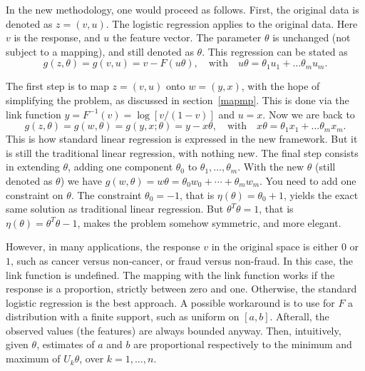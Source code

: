 \documentclass[oneside,10pt]{book}
\begin{document}
In the new methodology, one would proceed as follows. First, the original data is denoted as $z=(v,u)$. The logistic regression applies to the original data. Here $v$ is the response, 
 and $u$ the feature vector. The parameter $\theta$ is unchanged (not subject to a mapping), and still denoted as $\theta$.  This regression can be stated as
$$
g(z,\theta)=g(v,u)= v-F(u\theta), \quad \text{with } \text{ } u\theta=\theta_1 u_1 + \dots \theta_m u_m.
$$

The first step is to map $z=(v,u)$ onto $w=(y,x)$, with the hope of simplifying the problem, as discussed in section~\ref{mapmp}. This is done
 via the \textcolor{index}{link function} $y=F^{-1}(v)=\log[v/(1-v)]$ and $u=x$. Now we are back to 
$$
g(z,\theta)=g(w,\theta)=g(y,x;\theta)= y-x\theta, \quad \text{with } \text{ } x\theta=\theta_1 x_1 + \dots \theta_m x_m.
$$
This is how standard linear regression is expressed in the new framework. But it is still the traditional linear regression, with nothing new. The final step
 consists in extending $\theta$, adding one component $\theta_0$ to $\theta_1,\dots,\theta_m$. With the new $\theta$ (still denoted as $\theta$) we have $g(w,\theta)=w\theta=\theta_0 w_0+\cdots + \theta_m w_m$. You need to add one constraint on $\theta$. The constraint $\theta_0=-1$, 
 that is $\eta(\theta)=\theta_0+1$, yields the exact same solution as traditional linear regression. But $\theta^T\theta=1$, that is $\eta(\theta)=\theta^T\theta-1$, makes the problem somehow symmetric, and more elegant.

However, in many applications, the response $v$ in the original space is either $0$ or $1$, such as cancer versus non-cancer, or fraud versus non-fraud.  In this case, the link function is undefined. The mapping with the link function works if the response is a proportion, strictly between zero and one. Otherwise, the standard logistic regression  is the best approach. 
 A possible workaround is to use for $F$ a distribution with a finite support, such as uniform on $[a,b]$. Afterall, the observed values (the features) are always bounded anyway. Then, intuitively, given $\theta$, estimates of $a$ and $b$ are proportional respectively to the minimum and maximum of $U_k\theta$, over $k=1,\dots,n$. 
\end{document}
